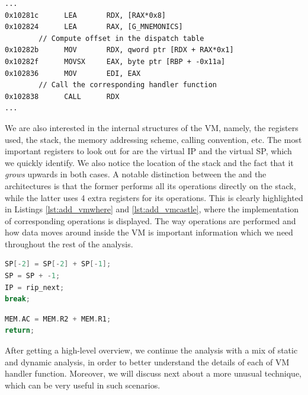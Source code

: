 \begin{lstlisting}[label={lst:indirect_call_vmcastle}, caption={x86\_64 disassembly of the \cc{vmcastle} dispatcher. The function handler corresponding to the current opcode is indirectly called through the register \cc{RDX}.}]
...
0x10281c      LEA       RDX, [RAX*0x8]
0x102824      LEA       RAX, [G_MNEMONICS]
        // Compute offset in the dispatch table
0x10282b      MOV       RDX, qword ptr [RDX + RAX*0x1] 
0x10282f      MOVSX     EAX, byte ptr [RBP + -0x11a]
0x102836      MOV       EDI, EAX
        // Call the corresponding handler function
0x102838      CALL      RDX  
...
\end{lstlisting}

We are also interested in the internal structures of the \gls{VM}, namely, the
registers used, the stack, the memory addressing scheme, calling convention,
etc. The most important registers to look out for are the virtual \gls{IP} and
the virtual \gls{SP}, which we quickly identify. We also notice the location of
the stack and the fact that it \emph{grows} upwards in both cases. A notable
distinction between the  and the  architectures is that
the former performs all its operations directly on the stack, while the latter
uses 4 extra registers for its operations. This is clearly highlighted in
Listings \ref{lst:add_vmwhere} and \ref{lst:add_vmcastle}, where the
implementation of corresponding  operations is displayed. The way
operations are performed and how data moves around inside the \gls{VM} is
important information which we need throughout the rest of the analysis.

\begin{multicols}{2}
    \begin{lstlisting}[language=c, label={lst:add_vmwhere}, caption={Stack-based implementation of a simple \cc{add} instruction in the \cc{vmwhere} architecture.}]
SP[-2] = SP[-2] + SP[-1];
SP = SP + -1;
IP = rip_next;
break;
\end{lstlisting}
\columnbreak
\begin{lstlisting}[language=c, label={lst:add_vmcastle}, caption={Register-based implementation of a simple \cc{add} instruction in the \cc{vmcastle} architecture.}]
MEM.AC = MEM.R2 + MEM.R1;
return;
\end{lstlisting}
\end{multicols}

After getting a high-level overview, we continue the analysis with a mix of static and dynamic analysis, in order to better understand the details of each of \gls{VM} handler function. Moreover, we will discuss next about a more unusual technique, which can be very useful in such scenarios.

